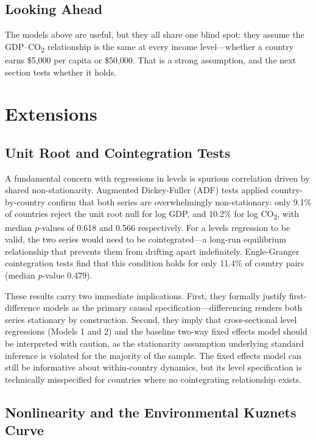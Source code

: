 \documentclass[12pt, a4paper]{article}
\begin{document}
\subsection*{Looking Ahead}
 
The models above are useful, but they all share one blind spot: they assume the GDP--CO\textsubscript{2} relationship is the same at every income level---whether a country earns \$5,000 per capita or \$50,000. That is a strong assumption, and the next section tests whether it holds.


\section{Extensions}
\label{sec:ext}
 
\subsection{Unit Root and Cointegration Tests}
 
A fundamental concern with regressions in levels is spurious correlation driven by shared non-stationarity. Augmented Dickey-Fuller (ADF) tests applied country-by-country confirm that both series are overwhelmingly non-stationary: only 9.1\% of countries reject the unit root null for log GDP, and 10.2\% for log CO\textsubscript{2}, with median $p$-values of 0.618 and 0.566 respectively. For a levels regression to be valid, the two series would need to be cointegrated---a long-run equilibrium relationship that prevents them from drifting apart indefinitely. Engle-Granger cointegration tests find that this condition holds for only 11.4\% of country pairs (median $p$-value 0.479).
 
These results carry two immediate implications. First, they formally justify first-difference models as the primary causal specification---differencing renders both series stationary by construction. Second, they imply that cross-sectional level regressions (Models 1 and 2) and the baseline two-way fixed effects model should be interpreted with caution, as the stationarity assumption underlying standard inference is violated for the majority of the sample. The fixed effects model can still be informative about within-country dynamics, but its level specification is technically misspecified for countries where no cointegrating relationship exists.
 
\subsection{Nonlinearity and the Environmental Kuznets Curve}
\label{subsec:ekc}
 
\end{document}
